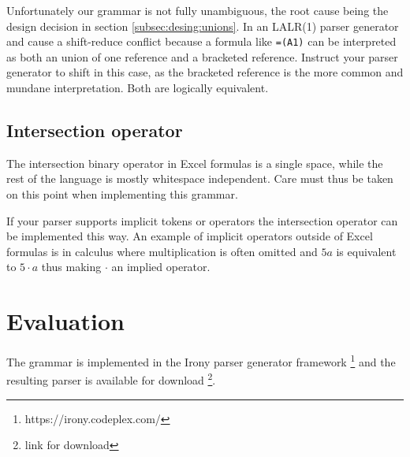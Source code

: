 \documentclass[conference]{IEEEtran}
\newcommand{\todo}[1]{\textbf{TODO: #1}}
\begin{document}
Unfortunately our grammar is not fully unambiguous, the root cause being the design decision in section \ref{subsec:desing:unions}.
In an LALR(1) parser generator  and  cause a shift-reduce conflict because a formula like \texttt{=(A1)} can be interpreted as both an union of one reference and a bracketed reference.
Instruct your parser generator to shift in this case, as the bracketed reference is the more common and mundane interpretation.
Both are logically equivalent.





\subsection{Intersection operator}

The intersection binary operator in Excel formulas is a single space, while the rest of the language is mostly whitespace independent.
Care must thus be taken on this point when implementing this grammar.

If your parser supports implicit tokens or operators the intersection operator can be implemented this way.
An example of implicit operators outside of Excel formulas is in calculus where multiplication is often omitted and $5a$ is equivalent to $5 \cdot a$ thus making $\cdot$ an implied operator.


\section{Evaluation}
The grammar is implemented in the Irony parser generator framework \footnote{https://irony.codeplex.com/} and the resulting parser is available for download \footnote{link for download}.
\end{document}
